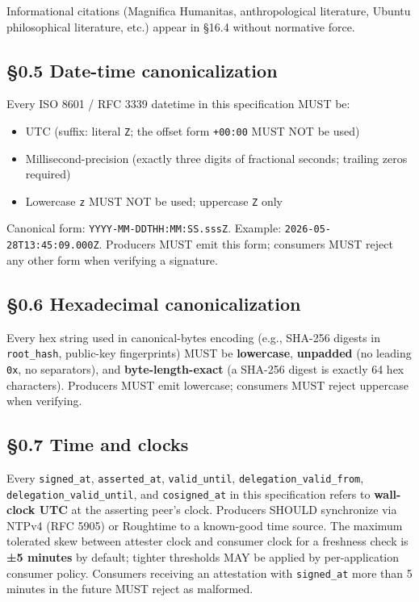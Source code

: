 \documentclass[10pt]{article}
\begin{document}
Informational citations (Magnifica Humanitas, anthropological literature, Ubuntu philosophical literature, etc.) appear in §16.4 without normative force.



\subsection*{§0.5 Date-time canonicalization}


Every ISO 8601 / RFC 3339 datetime in this specification MUST be:


\begin{itemize}\setlength\itemsep{0pt}
\item UTC (suffix: literal \texttt{Z}; the offset form \texttt{+00:00} MUST NOT be used)
\item Millisecond-precision (exactly three digits of fractional seconds; trailing zeros required)
\item Lowercase \texttt{z} MUST NOT be used; uppercase \texttt{Z} only
\end{itemize}


Canonical form: \texttt{YYYY-MM-DDTHH:MM:SS.sssZ}. Example: \texttt{2026-05-28T13:45:09.000Z}. Producers MUST emit this form; consumers MUST reject any other form when verifying a signature.



\subsection*{§0.6 Hexadecimal canonicalization}


Every hex string used in canonical-bytes encoding (e.g., SHA-256 digests in \texttt{root\_hash}, public-key fingerprints) MUST be \textbf{lowercase}, \textbf{unpadded} (no leading \texttt{0x}, no separators), and \textbf{byte-length-exact} (a SHA-256 digest is exactly 64 hex characters). Producers MUST emit lowercase; consumers MUST reject uppercase when verifying.



\subsection*{§0.7 Time and clocks}


Every \texttt{signed\_at}, \texttt{asserted\_at}, \texttt{valid\_until}, \texttt{delegation\_valid\_from}, \texttt{delegation\_valid\_until}, and \texttt{cosigned\_at} in this specification refers to \textbf{wall-clock UTC} at the asserting peer's clock. Producers SHOULD synchronize via NTPv4 (RFC 5905) or Roughtime to a known-good time source. The maximum tolerated skew between attester clock and consumer clock for a freshness check is \textbf{±5 minutes} by default; tighter thresholds MAY be applied by per-application consumer policy. Consumers receiving an attestation with \texttt{signed\_at} more than 5 minutes in the future MUST reject as malformed.
\end{document}
